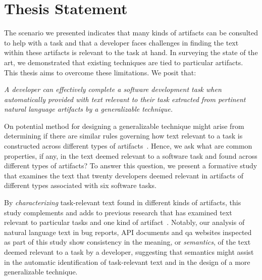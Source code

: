 

\section{Thesis Statement}
\label{cp1:thesis}





The scenario we presented indicates that many kinds of 
artifacts can be consulted to help 
with a task and that a developer faces challenges in finding the text within these 
artifacts is relevant to the task at hand. 
In surveying the state of the art, we demonstrated that existing techniques are tied to particular
artifacts. This thesis aims to overcome these limitations. We posit that:



\bigskip
\begin{bluequote}
    \textit{A developer can effectively complete a software development task when automatically provided with text relevant to their task extracted from pertinent natural language artifacts
    by a generalizable technique.}
\end{bluequote}
\medskip



On potential method for designing a generalizable technique 
might arise from 
determining if there are similar rules governing how text relevant to a task is 
constructed across different types of artifacts~\cite{Kintsch1978a}.
Hence, we ask what are common properties, if any, in the text deemed relevant 
to a software task and found across different types of artifacts?
To answer this question, we present a formative study that 
examines the text that twenty developers deemed relevant in artifacts 
of different types associated with six software tasks.


By \textit{characterizing} task-relevant text found in different kinds of artifacts,
this study complements and adds to previous research that has
examined text relevant to particular tasks and one kind of artifact~\cite{Ko2006, Rastkar2010, Chaparro2017, Robillard2015}.
Notably, our analysis of natural language text  in bug
reports, API documents and \ac{qa} websites 
inspected as part of this study 
 show consistency in the meaning, or \textit{semantics}, of the
 text deemed relevant to a task by a developer, suggesting that 
semantics might assist in the automatic identification of
task-relevant text and in the design of a more generalizable technique.




